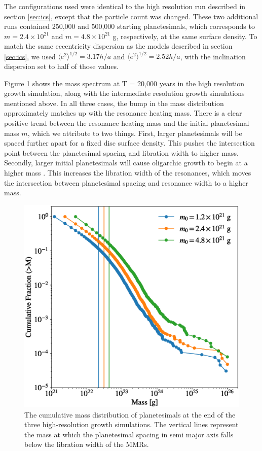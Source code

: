 The configurations used were identical to the high resolution run described in section \ref{sec:ics}, except that the particle count 
was changed. These two additional runs contained 250,000 and 500,000 starting planetesimals, which corresponds to $m = 2.4 
\times 10^{21}$ and $m = 4.8 \times 10^{21}$ g, respectively, at the same surface density. To match the same eccentricity 
dispersion as the models described in section \ref{sec:ics}, we used $\langle e^2 \rangle^{1/2} = 3.17 h/a$ and $\langle e^2 
\rangle^{1/2} = 2.52 h/a$, with the inclination dispersion set to half of those values.

Figure \ref{fig:resolution_mass_dist} shows the mass spectrum at T = 20,000 years in the high resolution growth simulation, 
along with the intermediate resolution growth simulations mentioned above. In all three cases, the bump in the mass distribution 
approximately matches up with the resonance heating mass. There is a clear positive trend between the resonance heating 
mass and the initial planetesimal mass $m$, which we attribute to two things. First, larger planetesimals will be spaced further 
apart for a fixed disc surface density. This pushes the intersection point between the planetesimal spacing and libration width to 
higher mass. Secondly, larger initial planetesimals will cause oligarchic growth to begin at a higher mass \cite{morishima17}. 
This increases the libration width of the resonances, which moves the intersection between planetesimal spacing and resonance 
width to a higher mass.

\begin{figure}
    \includegraphics[width=\columnwidth]{figures/plSS/cum_model_comparison.eps}
    \caption{The cumulative mass distribution of planetesimals at the end of the three high-resolution growth simulations. The 
    vertical lines represent the mass at which the planetesimal spacing in semi major axis falls below the libration width of the 
    MMRs.}
    \label{fig:resolution_mass_dist}
\end{figure}

